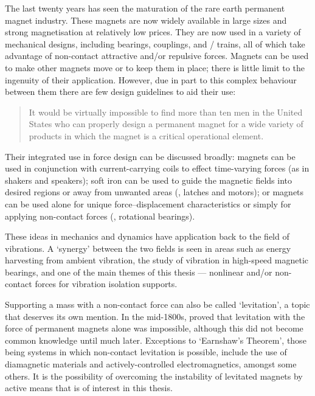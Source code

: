 \documentclass[11pt,a4paper]{memoir}
\begin{document}
The last twenty years has seen the maturation of the rare earth permanent magnet industry.
These magnets are now widely available in large sizes and strong magnetisation at relatively low prices.
They are now used in a variety of mechanical designs, including bearings, couplings, and \maglev/ trains, all of which take advantage of non-contact attractive and/or repulsive forces.
Magnets can be used to make other magnets move or to keep them in place; there is little limit to the ingenuity of their application.
However, due in part to this complex behaviour between them there are few design guidelines to aid their use:
\begin{quote}
It would be virtually impossible to find more than ten men in the United States who can properly design a permanent magnet for a wide variety of products in which the magnet is a critical operational element. \cite{moskowitz1995}
\end{quote}
Their integrated use in force design can be discussed broadly: magnets can be used in conjunction with current-carrying coils to effect time-varying forces (as in shakers and speakers); soft iron can be used to guide the magnetic fields into desired regions or away from unwanted areas (\eg, latches and motors); or magnets can be used alone for unique force--displacement characteristics or simply for applying non-contact forces (\eg, rotational bearings).

These ideas in mechanics and dynamics have application back to the field of vibrations.
A `synergy' between the two fields is seen in areas such as energy harvesting from ambient vibration, the study of vibration in high-speed magnetic bearings, and one of the main themes of this thesis — nonlinear and/or non-contact forces for vibration isolation supports.

Supporting a mass with a non-contact force can also be called `levitation', a topic that deserves its own mention.
In the mid-1800s, \textcite{earnshaw1842} proved that levitation with the force of permanent magnets alone was impossible, although this did not become common knowledge  until much later.
Exceptions to `Earnshaw's Theorem', those being systems in which non-contact levitation is possible, include the use of diamagnetic materials and actively-controlled electromagnetics, amongst some others.
It is the possibility of overcoming the instability of levitated magnets by active means that is of interest in this thesis.
\end{document}
